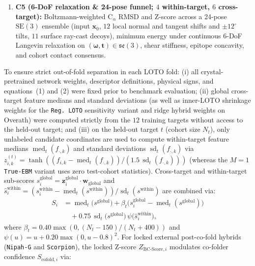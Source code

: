 \documentclass[10pt,twocolumn]{article}
\begin{document}
\begin{enumerate}
    \item \textbf{C5 (6-DoF relaxation \& 24-pose funnel; $4$ within-target, $6$ cross-target):} Boltzmann-weighted $\text{C}_\alpha$ RMSD and Z-score across a 24-pose $\text{SE}(3)$ ensemble (input $\mathbf{x}_0$, $12$ local normal and tangent shifts and $\pm 12^\circ$ tilts, $11$ surface ray-cast decoys), minimum energy under continuous 6-DoF Langevin relaxation on $(\bm{\omega}, \mathbf{t}) \in \mathfrak{se}(3)$, shear stiffness, epitope concavity, and cohort contact consensus.
\end{enumerate}

To ensure strict out-of-fold separation in each LOTO fold: (i) all crystal-pretrained network weights, descriptor definitions, physical signs, and equations~(1) and (2) were fixed prior to benchmark evaluation; (ii) global cross-target feature medians and standard deviations (as well as inner-LOTO shrinkage weights for the \texttt{Reg.\ LOTO} sensitivity variant and ridge hybrid weights on Overath) were computed strictly from the $12$ training targets without access to the held-out target; and (iii) on the held-out target $t$ (cohort size $N_t$), only unlabeled candidate coordinates are used to compute within-target feature medians $\operatorname{med}_t(f_{\cdot,k})$ and standard deviations $\operatorname{sd}_t(f_{\cdot,k})$ via $z_{i,k}^{(t)} = \tanh((f_{i,k} - \operatorname{med}_t(f_{\cdot,k})) / (1.5\,\operatorname{sd}_t(f_{\cdot,k})))$ (whereas the $M=1$ \texttt{True-EBM} variant uses zero test-cohort statistics). Cross-target and within-target sub-scores $s_i^{\text{global}} = \mathbf{z}_i^{\text{global}} \cdot \mathbf{w}_{\text{global}}$ and $\hat{s}_i^{\text{within}} = (s_i^{\text{within}} - \operatorname{med}_t(s^{\text{within}})) / \operatorname{sd}_t(s^{\text{within}})$ are combined via:
\begin{equation}
\begin{aligned}
    S_i &= \operatorname{med}_t\!\big(s^{\text{global}}\big) + \beta_t\!\big(s_i^{\text{global}} - \operatorname{med}_t(s^{\text{global}})\big) \\
    &\quad + 0.75\,\operatorname{sd}_t\!\big(s^{\text{global}}\big)\,\psi\!\big(\hat{s}_i^{\text{within}}\big),
\end{aligned}
\end{equation}
where $\beta_t = 0.40\max(0, (N_t - 150)/(N_t + 400))$ and $\psi(u) = u + 0.20\max(0, u - 0.8)^2$. For locked external post-co-fold hybrids (\texttt{Nipah-G} and \texttt{Scorpion}), the locked Z-score $Z_{\text{BC-Score},i}$ modulates co-folder confidence $S_{\text{cofold},i}$ via:
\end{document}
